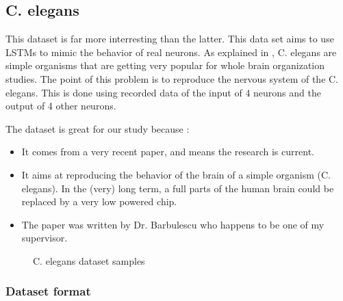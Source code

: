 \subsection{\ac{C. elegans}}

This dataset is far more interresting than the latter. This data set aims to use \acp{LSTM} to mimic the behavior of real neurons. As explained in \cite{celegans}, \acf{C. elegans} are simple organisms that are getting very popular for whole brain organization studies. The point of this problem is to reproduce the nervous system of the \ac{C. elegans}. This is done using recorded data of the input of 4 neurons and the output of 4 other neurons.

The dataset is great for our study because :
\begin{itemize}
  \item It comes from a very recent paper, and means the research is current.
  \item It aims at reproducing the behavior of the brain of a simple organism (\ac{C. elegans}). In the (very) long term, a full parts of the human brain could be replaced by a very low powered chip.
  \item The paper was written by Dr. Barbulescu who happens to be one of my supervisor.
\end{itemize}

\begin{figure}[H]
  \centering
  \begin{minipage}{\columnwidth}
    \hfill
  \end{minipage}
  \begin{minipage}{\columnwidth}
    \hfill
  \end{minipage}
  \caption{\ac{C. elegans} dataset samples}
  \label{graph:celegans}
\end{figure}

\subsubsection{Dataset format}

